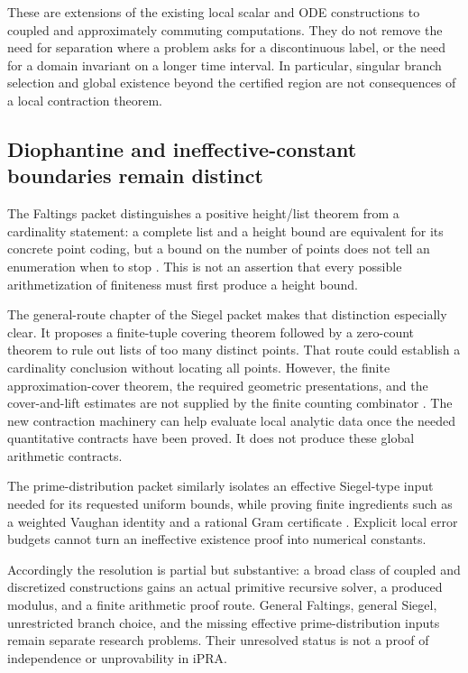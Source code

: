 These are extensions of the existing local scalar and ODE constructions
to coupled and approximately commuting computations.
They do not remove the need for separation where a problem asks for
a discontinuous label, or the need for a domain invariant on a longer
time interval. In particular, singular branch selection and global
existence beyond the certified region are not consequences of a local
contraction theorem.

\subsection{Diophantine and ineffective-constant boundaries remain distinct}

The Faltings packet distinguishes a positive height/list theorem from
a cardinality statement: a complete list and a height bound are equivalent
for its concrete point coding, but a bound on the number of points does not
tell an enumeration when to stop \cite{audit-faltings}.
This is not an assertion that every possible arithmetization of finiteness
must first produce a height bound.

The general-route chapter of the Siegel packet makes that distinction
especially clear. It proposes a finite-tuple covering theorem followed
by a zero-count theorem to rule out lists of too many distinct points.
That route could establish a cardinality conclusion without locating
all points. However, the finite approximation-cover theorem, the required
geometric presentations, and the cover-and-lift estimates are not supplied
by the finite counting combinator \cite{audit-siegel}.
The new contraction machinery can help evaluate local analytic data once
the needed quantitative contracts have been proved. It does not produce
these global arithmetic contracts.

The prime-distribution packet similarly isolates an effective
Siegel-type input needed for its requested uniform bounds, while proving
finite ingredients such as a weighted Vaughan identity and a rational Gram
certificate \cite{audit-primes}. Explicit local error budgets cannot turn
an ineffective existence proof into numerical constants.

Accordingly the resolution is partial but substantive: a broad class of
coupled and discretized constructions gains an actual primitive recursive
solver, a produced modulus, and a finite arithmetic proof route.
General Faltings, general Siegel, unrestricted branch choice, and the
missing effective prime-distribution inputs remain separate research
problems. Their unresolved status is not a proof of independence or
unprovability in iPRA.

